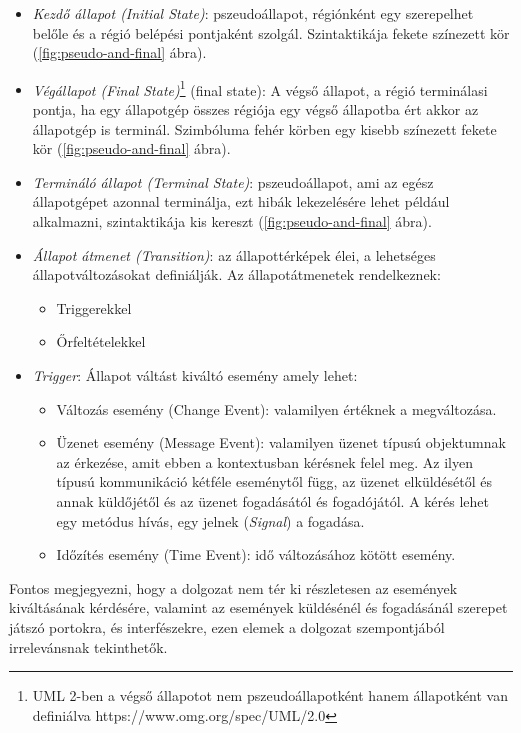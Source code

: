 \begin{itemize}
	\item \emph{Kezdő állapot (Initial State)}: pszeudoállapot, régiónként egy szerepelhet belőle és a régió belépési pontjaként szolgál. Szintaktikája fekete színezett kör (\ref{fig:pseudo-and-final} ábra).
	\item \emph{Végállapot (Final State)}\footnote{UML 2-ben a végső állapotot nem pszeudoállapotként hanem állapotként van definiálva https://www.omg.org/spec/UML/2.0} (final state): A végső állapot, a régió terminálasi pontja, ha egy állapotgép összes régiója egy végső állapotba ért akkor az állapotgép is terminál. Szimbóluma fehér körben egy kisebb színezett fekete kör (\ref{fig:pseudo-and-final} ábra).
	\item \emph{Termináló állapot (Terminal State)}: pszeudoállapot, ami az egész állapotgépet azonnal terminálja, ezt hibák lekezelésére lehet például alkalmazni, szintaktikája kis kereszt (\ref{fig:pseudo-and-final} ábra).
	\item \emph{Állapot átmenet (Transition)}: az állapottérképek élei, a lehetséges állapotváltozásokat definiálják. Az állapotátmenetek rendelkeznek:
		\begin{itemize}
			\item Triggerekkel
			\item Őrfeltételekkel
		\end{itemize}
	\item \emph{Trigger}: Állapot váltást kiváltó esemény amely lehet:
	\begin{itemize}
		\item Változás esemény (Change Event): valamilyen értéknek a megváltozása.
		\item Üzenet esemény (Message Event): valamilyen üzenet típusú objektumnak az érkezése, amit ebben a kontextusban kérésnek felel meg. Az ilyen típusú kommunikáció kétféle eseménytől függ, az üzenet elküldésétől és annak küldőjétől és az üzenet fogadásától és fogadójától. A kérés lehet egy metódus hívás, egy jelnek (\emph{Signal}) a fogadása.
		\item Időzítés esemény (Time Event): idő változásához kötött esemény.
	\end{itemize}

\end{itemize}
Fontos megjegyezni, hogy a dolgozat nem tér ki részletesen az események kiváltásának kérdésére, valamint az események küldésénél és fogadásánál szerepet játszó portokra, és interfészekre, ezen elemek a dolgozat szempontjából irrelevánsnak tekinthetők.
